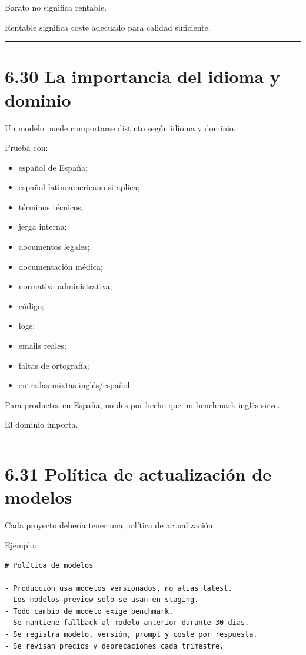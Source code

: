 Barato no significa rentable.

Rentable significa coste adecuado para calidad suficiente.

\begin{center}\rule{0.5\linewidth}{0.5pt}\end{center}

\section{6.30 La importancia del idioma y
dominio}\label{la-importancia-del-idioma-y-dominio}

Un modelo puede comportarse distinto según idioma y dominio.

Prueba con:

\begin{itemize}
\tightlist
\item
  español de España;
\item
  español latinoamericano si aplica;
\item
  términos técnicos;
\item
  jerga interna;
\item
  documentos legales;
\item
  documentación médica;
\item
  normativa administrativa;
\item
  código;
\item
  logs;
\item
  emails reales;
\item
  faltas de ortografía;
\item
  entradas mixtas inglés/español.
\end{itemize}

Para productos en España, no des por hecho que un benchmark inglés
sirve.

El dominio importa.

\begin{center}\rule{0.5\linewidth}{0.5pt}\end{center}

\section{6.31 Política de actualización de
modelos}\label{poluxedtica-de-actualizaciuxf3n-de-modelos}

Cada proyecto debería tener una política de actualización.

Ejemplo:

\begin{lstlisting}
# Política de modelos

- Producción usa modelos versionados, no alias latest.
- Los modelos preview solo se usan en staging.
- Todo cambio de modelo exige benchmark.
- Se mantiene fallback al modelo anterior durante 30 días.
- Se registra modelo, versión, prompt y coste por respuesta.
- Se revisan precios y deprecaciones cada trimestre.
\end{lstlisting}

